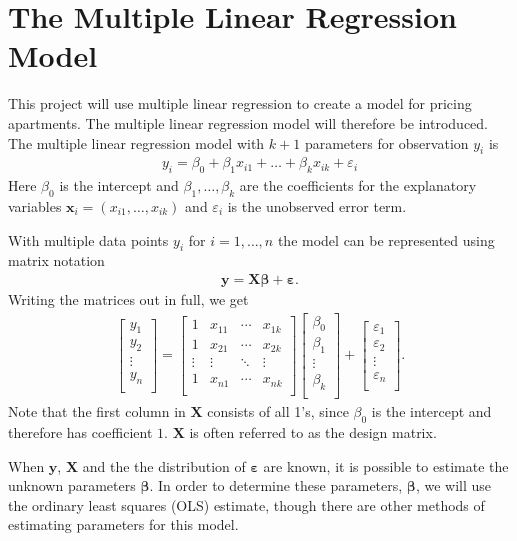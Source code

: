 \section{The Multiple Linear Regression Model}
This project will use multiple linear regression to create a model for pricing apartments. The multiple linear regression model will therefore be introduced. The multiple linear regression model with $k+1$ parameters for observation $y_i$ is
\begin{align}\label{eq:multiple_linear_regression}
  y_i = \beta_0 + \beta_1 x_{i1} + \ldots + \beta_k x_{ik} + \varepsilon_i
\end{align}
Here $\beta_0$ is the intercept and $\beta_1, \ldots, \beta_k$ are the coefficients for the explanatory variables $\textbf{x}_i = (x_{i1}, \ldots, x_{ik})$ and $\varepsilon_i$ is the unobserved error term.

With multiple data points $y_i$ for $i = 1, \ldots, n$ the model can be represented using matrix notation
\begin{align}\label{eq:multiple_linear_regression_model}
    \mathbf{y} = \mathbf{X} \boldsymbol{\beta} + \boldsymbol{\varepsilon}.
\end{align}
Writing the matrices out in full, we get
\begin{align}
  \begin{bmatrix}
    y_1 \\ y_2 \\ \vdots \\ y_n \\
  \end{bmatrix}
  =
  \begin{bmatrix}
    1 & x_{11} & \cdots & x_{1k} \\
    1 & x_{21} & \cdots & x_{2k} \\ \vdots & \vdots & \ddots & \vdots \\ 1 & x_{n1} & \cdots & x_{nk} \\
  \end{bmatrix}
  \begin{bmatrix}
    \beta_0 \\ \beta_1 \\ \vdots \\ \beta_k \\
  \end{bmatrix} +
  \begin{bmatrix}
    \varepsilon_1 \\ \varepsilon_2 \\ \vdots \\ \varepsilon_n \\
  \end{bmatrix}.
\end{align}
Note that the first column  in $\boldsymbol{X}$ consists of all 1's, since $\beta_{0}$ is the intercept and therefore has coefficient $1$. $\textbf{X}$ is often referred to as the design matrix. 

When $\textbf{y}$, $\textbf{X}$ and the the distribution of $\boldsymbol{\varepsilon}$ are known, it is possible to estimate the unknown parameters $\boldsymbol{\beta}$. 
In order to determine these parameters, $\boldsymbol{\beta}$, we will use the ordinary least squares (OLS) estimate, though there are other methods of estimating parameters for this model.